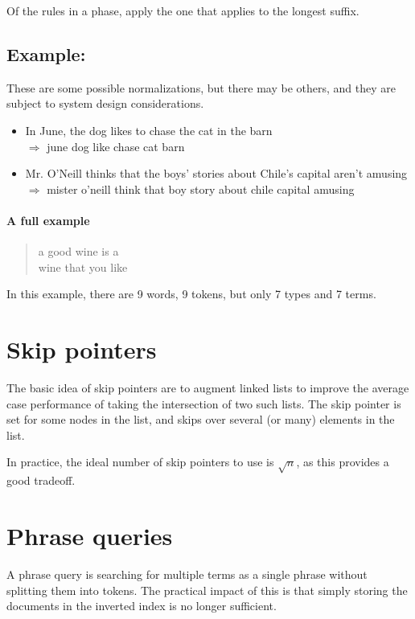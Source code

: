\documentclass{idc_msc}
\begin{document}
Of the rules in a phase, apply the one that applies to the longest suffix.

\subsection{Example:}

These are some possible normalizations, but there may be others, and they are subject to system design considerations.

\begin{itemize}
  \item In June, the dog likes to chase the cat in the barn\\
  \(\Rightarrow\) june dog like chase cat barn
  \item Mr. O'Neill thinks that the boys' stories about Chile's capital aren't amusing \\
  \(\Rightarrow\) mister o'neill think that boy story about chile capital amusing
\end{itemize}

\paragraph{A full example}

\begin{quote}
a good wine is a \\
wine that you like
\end{quote}

In this example, there are 9 words, 9 tokens, but only 7 types and 7 terms.

\section{Skip pointers}

The basic idea of skip pointers are to augment linked lists to improve the average case performance of taking the intersection of two such lists.
The skip pointer is set for some nodes in the list, and skips over several (or many) elements in the list.

In practice, the ideal number of skip pointers to use is \(\sqrt{n}\), as this provides a good tradeoff.

\section{Phrase queries}

A phrase query is searching for multiple terms as a single phrase without splitting them into tokens.
The practical impact of this is that simply storing the documents in the inverted index is no longer sufficient.
\end{document}
